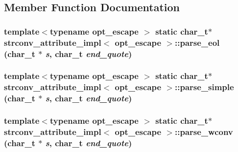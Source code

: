 \subsection{Member Function Documentation}
\hypertarget{structstrconv__attribute__impl_a0f57ee9d69b9d626765f4a9c8af6df2e}{
\subsubsection[{parse\_\-eol}]{\setlength{\rightskip}{0pt plus 5cm}template$<$typename opt\_\-escape $>$ static char\_\-t$\ast$ {\bf strconv\_\-attribute\_\-impl}$<$ opt\_\-escape $>$::parse\_\-eol (char\_\-t $\ast$ {\em s}, \/  char\_\-t {\em end\_\-quote})}}
\label{structstrconv__attribute__impl_a0f57ee9d69b9d626765f4a9c8af6df2e}
\hypertarget{structstrconv__attribute__impl_a8358dc980178e55c8669b9dcd04872d7}{
\subsubsection[{parse\_\-simple}]{\setlength{\rightskip}{0pt plus 5cm}template$<$typename opt\_\-escape $>$ static char\_\-t$\ast$ {\bf strconv\_\-attribute\_\-impl}$<$ opt\_\-escape $>$::parse\_\-simple (char\_\-t $\ast$ {\em s}, \/  char\_\-t {\em end\_\-quote})}}
\label{structstrconv__attribute__impl_a8358dc980178e55c8669b9dcd04872d7}
\hypertarget{structstrconv__attribute__impl_a2d39998b79896af7c53c5f3dc22a526b}{
\subsubsection[{parse\_\-wconv}]{\setlength{\rightskip}{0pt plus 5cm}template$<$typename opt\_\-escape $>$ static char\_\-t$\ast$ {\bf strconv\_\-attribute\_\-impl}$<$ opt\_\-escape $>$::parse\_\-wconv (char\_\-t $\ast$ {\em s}, \/  char\_\-t {\em end\_\-quote})}}
